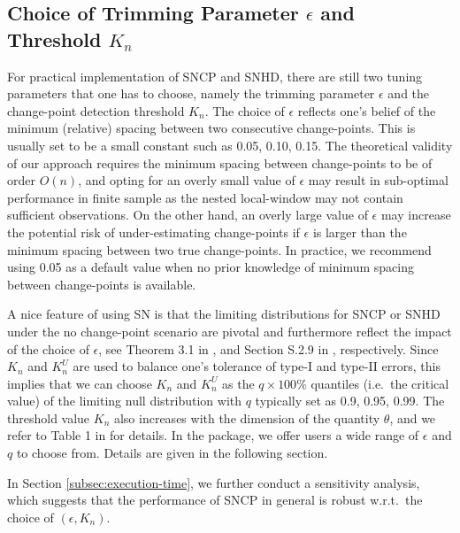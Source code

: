 \subsection{Choice of Trimming Parameter $\epsilon$ and  Threshold $K_n$}\label{subsec:SNtheory}
For practical implementation of SNCP and SNHD, there are still two tuning parameters that one has to choose, namely the trimming parameter $\epsilon$ and the change-point detection threshold $K_n$. The choice of  $\epsilon$ reflects one's   belief of the minimum (relative) spacing between two consecutive change-points. This is usually set to be a small constant such as 0.05, 0.10, 0.15.  { The theoretical validity of our approach requires the minimum spacing between change-points to be of order $O(n)$, and opting for an overly small value of $\epsilon$ may result in sub-optimal performance in finite sample as the nested local-window may not contain sufficient observations. On the other hand, an overly large value of $\epsilon$ may increase the potential risk of under-estimating change-points if $\epsilon$ is larger than the minimum spacing between two true change-points. In practice, we recommend using 0.05 as a default value when no prior knowledge of minimum spacing between change-points is available. }

{  A nice feature of using SN is that the limiting distributions for SNCP or SNHD under the no change-point scenario are pivotal and furthermore reflect the impact of the choice of $\epsilon$, see Theorem 3.1 in \cite{zhao2021segmenting}, and Section S.2.9 in \cite{zhao2021v1}, respectively.} Since $K_n$ and $K_n^U$ are used to balance one's tolerance of type-I and type-II errors, this implies that we can  choose $K_n$ and $K_n^U$ as the  $q\times 100\%$ quantiles (i.e.\ the critical value) of the limiting null distribution with $q$ typically set as 0.9, 0.95, 0.99. { The threshold value $K_n$ also increases with the dimension of the quantity $\theta$, and we refer to Table 1 in \cite{zhao2021segmenting} for details.} In the  package, we offer users a wide range of $\epsilon$ and $q$ to choose from. Details are given in the following section.

{ In Section \ref{subsec:execution-time}, we further conduct a sensitivity analysis, which suggests that the performance of SNCP in general is robust w.r.t.\ the choice of $(\epsilon,K_n)$.}

